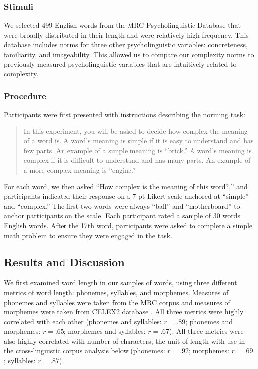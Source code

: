 \documentclass[man]{apa2}
\begin{document}
\subsubsection{Stimuli}
We selected 499 English words from the MRC Psycholinguistic Database \cite{wilson1988mrc} that were broadly distributed in their length and were relatively high frequency. This database includes norms for three other psycholinguistic variables: concreteness, familiarity, and imageability. This allowed us to compare our complexity norms to previously measured psycholinguistic variables that are intuitively related to complexity.

\subsubsection{Procedure}
Participants were first presented with instructions describing the norming task:
\begin{quote}
In this experiment, you will be asked to decide how complex the meaning of a word is. A word's meaning is simple if it is easy to understand and has few parts. An example of a simple meaning is ``brick.'' A word's meaning is complex if it is difficult to understand and has many parts. An example of a more complex meaning is ``engine.''
\end{quote}
For each word, we then asked ``How complex is the meaning of this word?,'' and participants indicated their response on a 7-pt Likert scale anchored at ``simple'' and ``complex.'' The first two words were always ``ball'' and ``motherboard'' to anchor participants on the scale. Each participant rated a sample of 30 words English words. After the 17th word, participants were asked to complete a simple math problem to ensure they were engaged in the task.

\subsection{Results and Discussion}

We first examined word length in our samples of words, using three different metrics of word length: phonemes, syllables, and morphemes. Measures of phonemes and syllables were taken from the MRC corpus \cite{wilson1988mrc} and measures of morphemes were taken from CELEX2 database \cite{baayen1995celex2}. All three metrics were highly correlated with each other (phonemes and syllables: $r = .89$; phonemes and morphemes: $r = .65$; morphemes and syllables: $r = .67$). All three metrics were also highly correlated with number of characters, the unit of length with use in the cross-linguistic corpus analysis below (phonemes: $r = .92$; morphemes: $r = .69$; syllables: $r = .87$).
\end{document}
